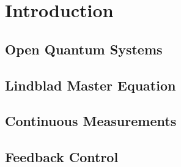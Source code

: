 \section{Introduction}
\subsection{Open Quantum Systems}
\subsection{Lindblad Master Equation}
\subsection{Continuous Measurements}
\subsection{Feedback Control}